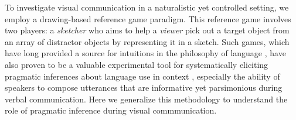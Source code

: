 \documentclass[9pt,twocolumn,twoside]{pnas-new}
\begin{document}


To investigate visual communication in a naturalistic yet controlled setting, we employ a drawing-based reference game paradigm.
This reference game involves two players: a \textit{sketcher} who aims to help a \textit{viewer} pick out a target object from an array of distractor objects by representing it in a sketch. 
Such games, which have long provided a source for intuitions in the philosophy of language \citep{wittgenstein1953philosophical,Lewis69_Convention}, have also proven to be a valuable experimental tool for systematically eliciting pragmatic inferences about language use in context \cite{goodman2016pragmatic,kao2014formalizing,goodman2013knowledge,frank2012predicting}, especially the ability of speakers to compose utterances that are informative \cite{grice1975syntax,wilson1986relevance} yet parsimonious \cite{zipf1936psycho} during verbal communication. 
Here we generalize this methodology to understand the role of pragmatic inference during visual commmunication. 

\end{document}
